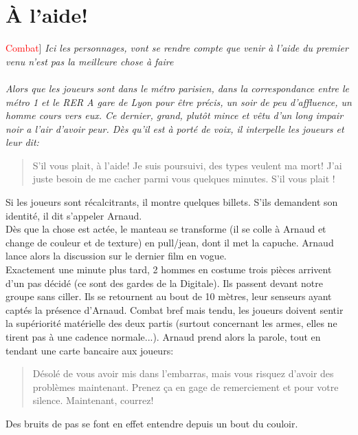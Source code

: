 \documentclass[10pt,a4paper,twocolumn]{article}
\newenvironment{lAbstract}[1]{{[}\textcolor{red}{#1}{]}\itshape}{\\ \\}
\begin{document}
\section{À l'aide!}
\begin{lAbstract}{Combat}
Ici les personnages, vont se rendre compte que venir à l'aide du premier venu n'est pas la meilleure chose à faire
\end{lAbstract}
Alors que les joueurs sont dans le métro parisien, dans la correspondance entre le métro 1 et le RER A gare de Lyon pour être précis, un soir de peu d'affluence, un homme cours vers eux. Ce  dernier, grand, plutôt mince et vêtu d'un long impair noir a l'air d'avoir peur. Dès qu'il est à porté de voix, il interpelle les joueurs et leur dit:
\begin{quote}
S'il vous plait, à l'aide! Je suis poursuivi, des types veulent ma mort! J'ai juste besoin de me cacher parmi vous quelques minutes. S'il vous plait !
\end{quote}
Si les joueurs sont récalcitrants, il montre quelques billets. S'ils demandent son identité, il dit s'appeler Arnaud.
\\
Dès que la chose est actée, le manteau se transforme (il se colle à Arnaud et change de couleur et de texture) en pull/jean, dont il met la capuche. Arnaud lance alors la discussion sur le dernier film en vogue.\\
Exactement une minute plus tard, 2 hommes en costume trois pièces arrivent d'un pas décidé (ce sont des gardes de la Digitale). Ils passent devant notre groupe sans ciller. Ils se retournent au bout de 10 mètres, leur senseurs ayant captés la présence d'Arnaud. Combat bref mais tendu, les joueurs doivent sentir la supériorité matérielle des deux partis (surtout concernant les armes, elles ne tirent pas à une cadence normale...). Arnaud prend alors la parole, tout en tendant une carte bancaire aux joueurs:
\begin{quote}
Désolé de vous avoir mis dans l'embarras, mais vous risquez d'avoir des problèmes maintenant. Prenez ça en gage de remerciement et pour votre silence. Maintenant, courrez!
\end{quote}
Des bruits de pas se font en effet entendre depuis un bout du couloir.
\end{document}
